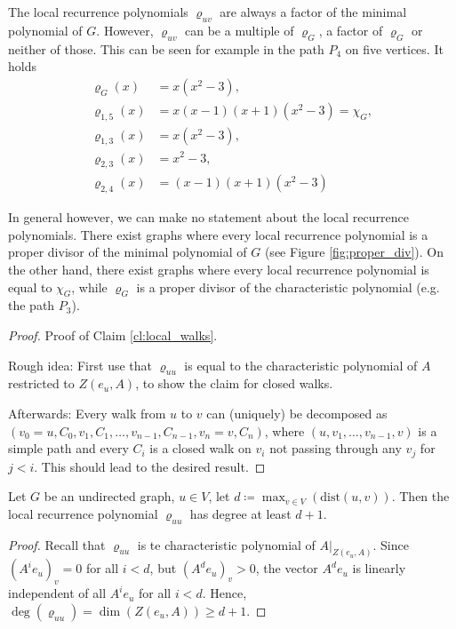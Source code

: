 \documentclass[a4paper,12pt]{article}
\begin{document}
\begin{remark}
The local recurrence polynomials $\varrho_{uv}$ are always a factor of the minimal polynomial of $G$. However, $\varrho_{uv}$ can be a multiple of $\varrho_G$, a factor of $\varrho_G$ or neither of those. This can be seen for example in the path $P_4$ on five vertices. It holds
\begin{align*}
\varrho_G(x) &= x(x^2-3),\\
\varrho_{1,5}(x) &= x(x-1)(x+1)(x^2-3) = \chi_G,\\
\varrho_{1,3}(x) &= x(x^2-3),\\
\varrho_{2,3}(x) &= x^2-3,\\
\varrho_{2,4}(x) &= (x-1)(x+1)(x^2-3)
\end{align*}

In general however, we can make no statement about the local recurrence polynomials. There exist graphs where every local recurrence polynomial is a proper divisor of the minimal polynomial of $G$ (see Figure \ref{fig:proper_div}). On the other hand, there exist graphs where every local recurrence polynomial is equal to $\chi_G$, while $\varrho_G$ is a proper divisor of the characteristic polynomial (e.g. the path $P_3$).
\end{remark}


\begin{proof}
Proof of Claim \ref{cl:local_walks}.

\noindent Rough idea: First use that $\varrho_{uu}$ is equal to the characteristic polynomial of $A$ restricted to $Z(e_u,A)$, to show the claim for closed walks.

Afterwards: Every walk from $u$ to $v$ can (uniquely) be decomposed as $(v_0=u, C_0, v_1, C_1, \ldots,v_{n-1}, C_{n-1}, v_n=v, C_n)$, where $(u, v_1, \ldots, v_{n-1}, v)$ is a simple path and every $C_i$ is a closed walk on $v_i$ not passing through any $v_j$ for $j < i$. This should lead to the desired result.
\end{proof}

\begin{cor}
Let $G$ be an undirected graph, $u \in V$, let $d \coloneqq \max_{v\in V}(\text{dist}(u,v))$. Then the local recurrence polynomial $\varrho_{uu}$ has degree at least $d+1$.
\end{cor}

\begin{proof}
Recall that $\varrho_{uu}$ is te characteristic polynomial of $A|_{Z(e_u,A)}$. Since $\left(A^ie_u\right)_v = 0$ for all $i < d$, but $\left(A^de_u\right)_v > 0$, the vector $A^de_u$ is linearly independent of all $A^ie_u$ for all $i < d$. Hence, $\deg\left(\varrho_{uu}\right) = \dim\left(Z(e_u,A)\right) \ge d+1$.
\end{proof}
\end{document}
